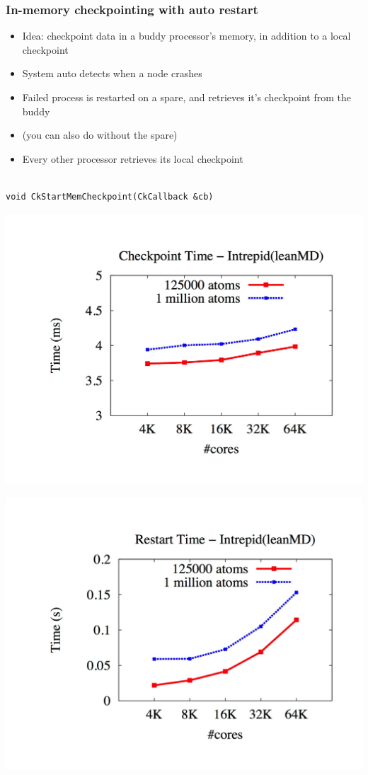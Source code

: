 \begin{frame}[fragile]
  \frametitle{In-memory checkpointing with auto restart}
\begin{itemize}

\item Idea: checkpoint data in a buddy processor's memory, in addition
  to a local checkpoint
\item System auto detects when a node crashes
\item  Failed process is restarted on a spare, and retrieves it's
  checkpoint from the buddy
\item (you can also do without the spare)
\item Every other processor retrieves its local checkpoint 
\end{itemize}

 \begin{lstlisting}[basicstyle=\footnotesize]

void CkStartMemCheckpoint(CkCallback &cb)
\end{lstlisting}

\end{frame}

\begin{frame}[fragile]
  \includegraphics[width=\textwidth]{figures/checkpointTimeIntrepid.png}
\end{frame}

\begin{frame}[fragile]
  \includegraphics[width=\textwidth]{figures/restartTimeIntrepid.png}
\end{frame}

